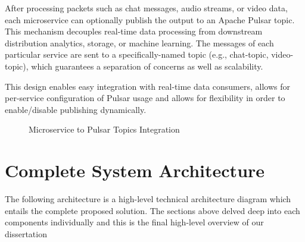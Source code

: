 {After processing packets such as chat messages, audio streams, or video data, each microservice can optionally publish the output to an Apache Pulsar topic. This mechanism decouples real-time data processing from downstream distribution analytics, storage, or machine learning. The messages of each particular service are sent to a specifically-named topic (e.g., chat-topic, video-topic), which guarantees a separation of concerns as well as scalability.

This design enables easy integration with real-time data consumers, allows for per-service configuration of Pulsar usage and allows for flexibility in order to enable/disable publishing dynamically.



\begin{figure}[h]
\centering
{}
\caption{Microservice to Pulsar Topics Integration}
\label{fig:microservice_pulsar}
\end{figure}



\section{Complete System Architecture}

The following architecture is a high-level technical architecture diagram which entails the complete proposed solution. The sections above delved deep into each components individually and this is the final high-level overview of our dissertation

}
